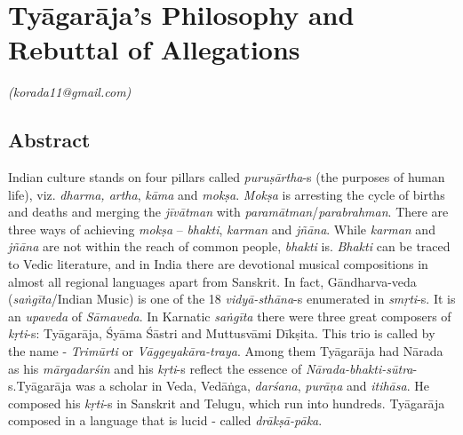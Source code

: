 
\chapter{Tyāgarāja’s Philosophy and Rebuttal of Allegations}\label{chapter3}


\vspace{-.3cm}


\begin{flushright}
\textit{(korada11@gmail.com)}
\end{flushright}


\section*{Abstract}

Indian culture stands on four pillars called \textit{puruṣārtha}-s (the purposes of human life), viz. \textit{dharma, artha}, \textit{kāma} and \textit{mokṣa}. \textit{Mokṣa} is arresting the cycle of births and deaths and merging the \textit{jīvātman} with \textit{paramātman}/\textit{parabrahman}. There are three ways of achieving \textit{mokṣa} – \textit{bhakti}, \textit{karman} and \textit{jñāna}. While \textit{karman} and \textit{jñāna} are not within the reach of common people, \textit{bhakti} is. \textit{Bhakti} can be traced to Vedic literature, and in India there are devotional musical compositions in almost all regional languages apart from Sanskrit. In fact, Gāndharva-veda (\textit{saṅgīta}/Indian Music) is one of the 18 \textit{vidyā-sthāna}-s enumerated in \textit{smṛti}-s. It is an \textit{upaveda} of \textit{Sāmaveda}. In Karnatic \textit{saṅgīta} there were three great composers of \textit{kṛti}-s: Tyāgarāja, Śyāma Śāstri and Muttusvāmi Dīkṣita. This trio is called by the name - \textit{Trimūrti} or \textit{Vāggeyakāra-traya}. Among them Tyāgarāja had Nārada as his \textit{mārgadarśin} and his \textit{kṛti}-s reflect the essence of \textit{Nārada-bhakti-sūtra}-s.\break Tyāgarāja was a scholar in Veda, Vedāṅga, \textit{darśana}, \textit{purāṇa} and \textit{itihāsa}. He composed his \textit{kṛti}-s in Sanskrit and Telugu, which run into hundreds. Tyāgarāja composed in a language that is lucid - called \textit{drākṣā-pāka}. 

